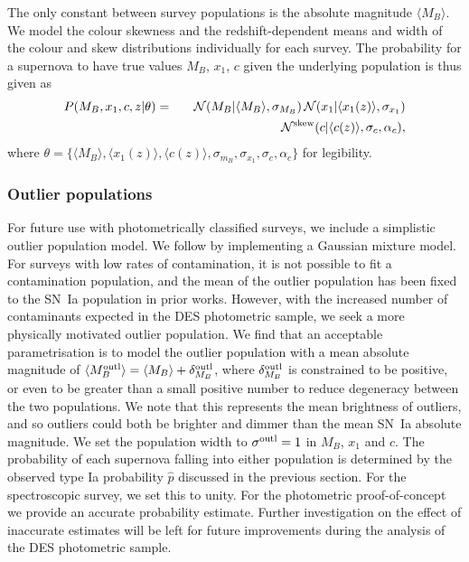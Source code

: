 \documentclass[twocolumn,trackchanges,tighten]{aastex62}
\newcommand{\rubin}{\citetalias{Rubin2015}}
\begin{document}
The only constant between survey populations is the absolute magnitude $\langle M_B \rangle$. We model the colour skewness and the redshift-dependent means and width of the colour and skew distributions individually for each survey. The probability for a supernova to have true values $M_B$, $x_1$, $c$ given the underlying population is thus given as
\begin{eqnarray}
P(M_B, x_1, c, z | \theta) &=& \mathcal{N}(M_B|\langle M_B \rangle, \sigma_{M_B}) \, \mathcal{N}(x_1 | \langle x_1(z) \rangle, \sigma_{x_1})\notag\\ &\quad\quad& \mathcal{N}^{\rm{skew}}(c| \langle c(z) \rangle, \sigma_c, \alpha_c) \label{eq:l1},
\end{eqnarray}
where $\theta = \lbrace \langle M_B \rangle, \langle x_1(z) \rangle, \langle c(z) \rangle, \sigma_{m_B}, \sigma_{x_1}, \sigma_c, \alpha_c \rbrace$ for legibility.

\subsubsection{Outlier populations}

For future use with photometrically classified surveys, we include a simplistic outlier population model. We follow {\rubin} \citep[and therefore ][]{Kunz2007} by implementing a Gaussian mixture model. For surveys with low rates of contamination, it is not possible to fit a contamination population, and the mean of the outlier population has been fixed to the SN~Ia population in prior works. However, with the increased number of contaminants expected in the DES photometric sample, we seek a more physically motivated outlier population.  We find that an acceptable parametrisation is to model the outlier population with a mean absolute magnitude of $\langle M_B^{\rm outl} \rangle = \langle M_B \rangle + \delta_{M_B}^{\rm outl}$, where $\delta_{M_B}^{\rm outl}$ is constrained to be positive, or even to be greater than a small positive number to reduce degeneracy between the two populations.  We note that this represents the mean brightness of outliers, and so outliers could both be brighter and dimmer than the mean SN~Ia absolute magnitude. We set the population width to $\sigma^{\rm outl} = 1$ in $M_B$, $x_1$ and $c$. The probability of each supernova falling into either population is determined by the observed type Ia probability $\hat{p}$ discussed in the previous section. For the spectroscopic survey, we set this to unity. For the photometric proof-of-concept we provide an accurate probability estimate. Further investigation on the effect of inaccurate estimates will be left for future improvements during the analysis of the DES photometric sample.
\end{document}
